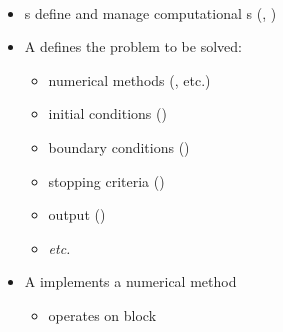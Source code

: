 
\begin{frame}[fragile] 
\secframetitle{\ssComponents}
\framesubtitle{}

\begin{itemize}
\item {}s define and manage computational s
(, )
\item A  defines the problem to be solved:
\begin{itemize}
\item numerical methods (, etc.)
\item initial conditions ()
\item boundary conditions ()
\item stopping criteria  ()
\item output ()
\item \textit{etc.}
\end{itemize}
\item A  implements a numerical method
\begin{itemize}
\item operates on block 
\end{itemize}

\end{itemize}
\end{frame}


